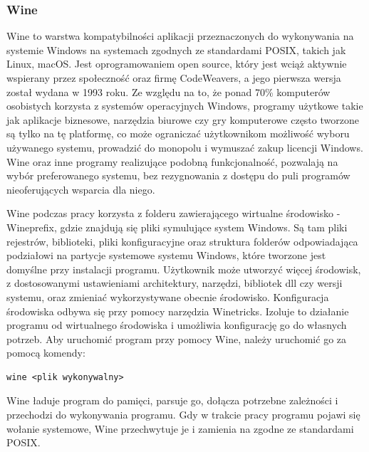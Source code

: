 \subsubsection{Wine\cite{wine}}
Wine to warstwa kompatybilności aplikacji przeznaczonych do wykonywania na systemie Windows na systemach zgodnych ze standardami POSIX, takich jak Linux, macOS. Jest oprogramowaniem open source, który jest wciąż aktywnie wspierany przez społeczność oraz firmę CodeWeavers, a jego pierwsza wersja został wydana w 1993 roku. Ze względu na to, że ponad 70\% komputerów osobistych korzysta z systemów operacyjnych Windows\cite{windowsMarketShare}, programy użytkowe takie jak aplikacje biznesowe, narzędzia biurowe czy gry komputerowe często tworzone są tylko na tę platformę, co może ograniczać użytkownikom możliwość wyboru używanego systemu, prowadzić do monopolu i wymuszać zakup licencji Windows. Wine oraz inne programy realizujące podobną funkcjonalność, pozwalają na wybór preferowanego systemu, bez rezygnowania z dostępu do puli programów nieoferujących wsparcia dla niego.


Wine podczas pracy korzysta z folderu zawierającego wirtualne środowisko - Wineprefix\cite{wineprefix}, gdzie znajdują się pliki symulujące system Windows. Są tam pliki rejestrów, biblioteki, pliki konfiguracyjne oraz struktura folderów odpowiadająca podziałowi na partycje systemowe systemu Windows, które tworzone jest domyślne przy instalacji programu. Użytkownik może utworzyć więcej środowisk, z dostosowanymi ustawieniami architektury, narzędzi, bibliotek dll czy wersji systemu, oraz zmieniać wykorzystywane obecnie środowisko. Konfiguracja środowiska odbywa się przy pomocy narzędzia Winetricks\cite{winetricks}. Izoluje to działanie programu od wirtualnego środowiska i umożliwia konfigurację go do własnych potrzeb. Aby uruchomić program przy pomocy Wine, należy uruchomić go za pomocą komendy:
\begin{verbatim}
wine <plik wykonywalny>
\end{verbatim} Wine ładuje program do pamięci, parsuje go, dołącza potrzebne zależności i przechodzi do wykonywania programu. Gdy w trakcie pracy programu pojawi się wołanie systemowe, Wine przechwytuje je i zamienia na zgodne ze standardami POSIX. 


